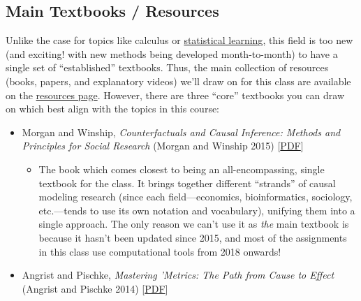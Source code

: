 \documentclass[
]{scrartcl}
\providecommand{\tightlist}{%
  \setlength{\itemsep}{0pt}\setlength{\parskip}{0pt}}\usepackage{longtable,booktabs,array}
\begin{document}
\subsection{Main Textbooks / Resources}\label{main-textbooks-resources}

Unlike the case for topics like calculus or
\href{https://www.statlearning.com/}{statistical learning}, this field
is too new (and exciting! with new methods being developed
month-to-month) to have a single set of ``established'' textbooks. Thus,
the main collection of resources (books, papers, and explanatory videos)
we'll draw on for this class are available on the
\href{./resources.qmd}{resources page}. However, there are three
``core'' textbooks you can draw on which best align with the topics in
this course:

\begin{itemize}
\tightlist
\item
  Morgan and Winship, \emph{Counterfactuals and Causal Inference:
  Methods and Principles for Social Research} (Morgan and Winship 2015)
  {[}\href{https://www.dropbox.com/scl/fi/rmuw9yw0gflg9wprufzu4/Counterfactuals-and-Causal-Inference.pdf?rlkey=gpzpuqgmzgsdwo18j22pl6yiw&dl=1}{PDF}{]}

  \begin{itemize}
  \tightlist
  \item
    The book which comes closest to being an all-encompassing, single
    textbook for the class. It brings together different ``strands'' of
    causal modeling research (since each field---economics,
    bioinformatics, sociology, etc.---tends to use its own notation and
    vocabulary), unifying them into a single approach. The only reason
    we can't use it as \emph{the} main textbook is because it hasn't
    been updated since 2015, and most of the assignments in this class
    use computational tools from 2018 onwards!
  \end{itemize}
\item
  Angrist and Pischke, \emph{Mastering 'Metrics: The Path from Cause to
  Effect} (Angrist and Pischke 2014)
  {[}\href{https://www.dropbox.com/scl/fi/3xa9tfswmv1w8ez54prtk/Joshua-D.-Angrist-J-rn-Steffen-Pischke-Mastering-Metrics.pdf?rlkey=2w0ipphrgxrejd7ddkv1wd635&dl=1}{PDF}{]}


\end{itemize}
\end{document}
